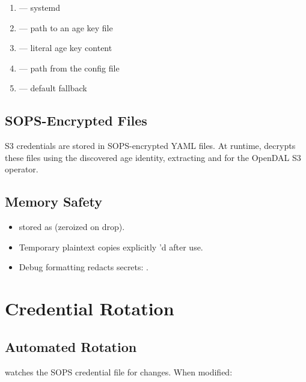 \documentclass[11pt,a4paper]{article}
\begin{document}
\begin{enumerate}
  \item {} --- systemd
  \item {} --- path to an age key file
  \item {} --- literal age key content
  \item {} --- path from the config file
  \item {} --- default fallback
\end{enumerate}

\subsection{SOPS-Encrypted Files}

S3 credentials are stored in SOPS-encrypted YAML files. At runtime, \tcfsd{}
decrypts these files using the discovered age identity, extracting
 and  for the OpenDAL S3
operator.

\subsection{Memory Safety}

\begin{itemize}
  \item {} stored as 
        (zeroized on drop).
  \item Temporary plaintext copies explicitly 'd after use.
  \item Debug formatting redacts secrets:
        .
\end{itemize}

\section{Credential Rotation}

\subsection{Automated Rotation}

\tcfsd{} watches the SOPS credential file for changes. When modified:
\end{document}
